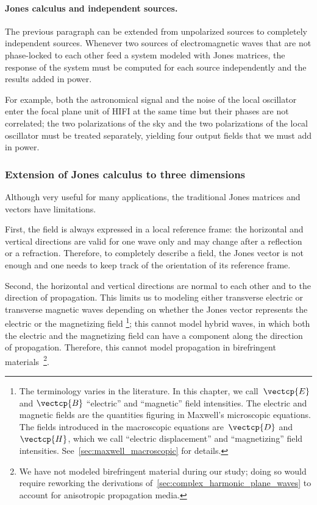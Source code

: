 \begin{refsection}
\paragraph{Jones calculus and independent sources.}
\label{sec:jones_independent}
The previous paragraph can be extended from unpolarized sources to completely independent sources.
Whenever two sources of electromagnetic waves that are not phase-locked to each other feed a system modeled with Jones matrices, the response of the system must be computed for each source independently and the results added in power.

For example, both the astronomical signal and the noise of the local oscillator enter the focal plane unit of HIFI at the same time but their phases are not correlated;
the two polarizations of the sky and the two polarizations of the local oscillator must be treated separately, yielding four output fields that we must add in power.




\subsubsection{Extension of Jones calculus to three dimensions}
Although very useful for many applications, the traditional Jones matrices and vectors have limitations.

First, the field is always expressed in a local reference frame: the horizontal and vertical directions are valid for one wave only and may change after a reflection or a refraction.
Therefore, to completely describe a field, the Jones vector is not enough and one needs to keep track of the orientation of its reference frame.

Second, the horizontal and vertical directions are normal to each other and to the direction of propagation.
This limits us to modeling either transverse electric or transverse magnetic waves depending on whether the Jones vector represents the electric or the magnetizing field%
\footnote{
The terminology varies in the literature.
In this chapter, we call~$\vectcp{E}$ and $\vectcp{B}$ ``electric'' and ``magnetic'' field intensities.
The electric and magnetic fields are the quantities figuring in Maxwell's microscopic equations.
The fields introduced in the macroscopic equations are~$\vectcp{D}$ and $\vectcp{H}$, which we call ``electric displacement'' and ``magnetizing'' field intensities.
See~\cref{sec:maxwell_macroscopic} for details.
};
this cannot model hybrid waves, in which both the electric and the magnetizing field can have a component along the direction of propagation.
Therefore, this cannot model propagation in birefringent materials~\footnote{We have not modeled birefringent material during our study; doing so would require reworking the derivations of~\cref{sec:complex_harmonic_plane_waves} to account for anisotropic propagation media.}.


\end{refsection}
